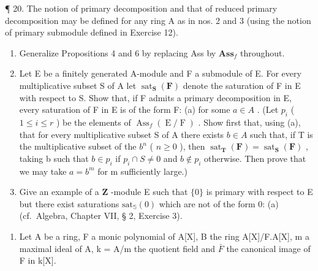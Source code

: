 ¶ 20. The notion of primary decomposition and that of reduced primary decomposition may be defined for any ring A as in nos. 2 and 3 (using the notion of primary submodule defined in Exercise 12).

\begin{enumerate}
\def\labelenumi{(\alph{enumi})}
\item
  Generalize Propositions 4 and 6 by replacing Ass by \(\mathbf{Ass}_f\) throughout.
\item
  Let E be a finitely generated A-module and F a submodule of E. For every multiplicative subset S of A let \(\operatorname{sat}_{\mathbf{S}}(\mathbf{F})\) denote the saturation of F in E with respect to S. Show that, if F admits a primary decomposition in E, every saturation of F in E is of the form F: (a) for some \(a \in A\) . (Let \(p_{i}\) ( \(1 \leqslant i \leqslant r\) ) be the elements of \(\operatorname{Ass}_{f}(\operatorname{E}/\operatorname{F})\) . Show first that, using (a), that for every multiplicative subset S of A there exists \(b \in A\) such that, if T is the multiplicative subset of the \(b^{n}\) ( \(n \geqslant 0\) ), then \(\operatorname{sat}_{\mathbf{T}}(\mathbf{F}) = \operatorname{sat}_{\mathbf{S}}(\mathbf{F})\) , taking b such that \(b \in p_{i}\) if \(p_{i} \cap S \neq 0\) and \(b \notin p_{i}\) otherwise. Then prove that we may take \(a = b^{m}\) for m sufficiently large.)
\item
  Give an example of a \(\mathbf{Z}\) -module E such that \(\{0\}\) is primary with respect to E but there exist saturations \(\mathrm{sat}_{\mathbb{S}}(0)\) which are not of the form 0: (a) (cf.~Algebra, Chapter VII, § 2, Exercise 3).
\end{enumerate}

\begin{enumerate}
\def\labelenumi{\arabic{enumi}.}
\setcounter{enumi}{20}
\tightlist
\item
  Let A be a ring, F a monic polynomial of A{[}X{]}, B the ring A{[}X{]}/F.A{[}X{]}, m a maximal ideal of A, k = A/m the quotient field and \(\bar{F}\) the canonical image of F in k{[}X{]}.
\end{enumerate}


